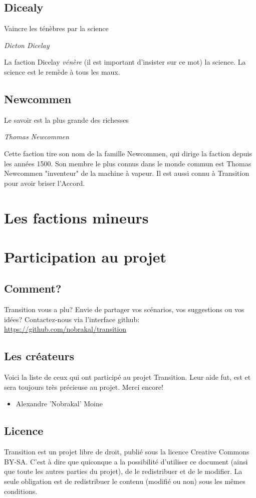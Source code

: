 \documentclass{book}
\begin{document}
\subsection{Dicealy}
\epigraph{Vaincre les ténèbres par la science}{\textit{Dicton Dicelay}}
La faction Dicelay \emph{vénère} (il est important d'insister sur ce mot) la science. La science est le remède à tous les maux.

\subsection{Newcommen}
\epigraph{Le savoir est la plus grande des richesses}{\textit{Thomas Newcommen}}
Cette faction tire son nom de la famille Newcommen, qui dirige la faction depuis les années 1500. Son membre le plus connus dans le monde commun est Thomas Newcommen "inventeur" de la machine à vapeur. Il est aussi connu à Transition pour avoir briser l'Accord.

\section{Les factions mineurs}


\newpage
\section{Participation au projet}
\subsection{Comment?}
\hypertarget{participation}{}
Transition vous a plu? 
Envie de partager vos scénarios, vos suggestions ou vos idées?
\newline
Contactez-nous via l'interface github: \href {https://github.com/nobrakal/transition} {https://github.com/nobrakal/transition}
\subsection{Les créateurs}
Voici la liste de ceux qui ont participé au projet Transition. Leur aide fut, est et sera toujours très précieuse au projet. Merci encore!  
\begin{itemize}
\item Alexandre ’Nobrakal’ Moine 
\end{itemize}
\subsection{Licence}
Transition est un projet libre de droit, publié sous la licence Creative Commons BY-SA. C'est à dire que quiconque a la possibilité d'utiliser ce document (ainsi que toute les autres parties du projet), de le redistribuer et de le modifier. La seule obligation est de redistribuer le contenu (modifié ou non) sous les mêmes conditions.
\end{document}
